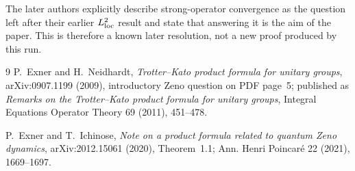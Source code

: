 \documentclass[11pt]{article}
\begin{document}
The later authors explicitly describe strong-operator convergence as the
question left after their earlier $L^2_{\rm loc}$ result and state that
answering it is the aim of the paper.  This is therefore a known later
resolution, not a new proof produced by this run.

\begin{thebibliography}{9}
P.~Exner and H.~Neidhardt,
\emph{Trotter--Kato product formula for unitary groups},
arXiv:0907.1199 (2009), introductory Zeno question on PDF page~5;
published as \emph{Remarks on the Trotter--Kato product formula for unitary
groups}, Integral Equations Operator Theory 69 (2011), 451--478.

P.~Exner and T.~Ichinose,
\emph{Note on a product formula related to quantum Zeno dynamics},
arXiv:2012.15061 (2020), Theorem~1.1;
Ann. Henri Poincar\'e 22 (2021), 1669--1697.
\end{thebibliography}
\end{document}
